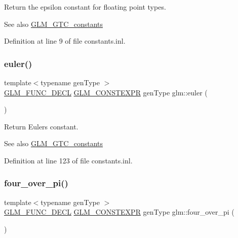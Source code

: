 Return the epsilon constant for floating point types. \begin{DoxySeeAlso}{See also}
\mbox{\hyperlink{group__gtc__constants}{G\+L\+M\+\_\+\+G\+T\+C\+\_\+constants}} 
\end{DoxySeeAlso}


Definition at line 9 of file constants.\+inl.

\mbox{\label{group__gtc__constants_gad8fe2e6f90bce9d829e9723b649fbd42}} 
\subsubsection{\texorpdfstring{euler()}{euler()}}
{\footnotesize\ttfamily template$<$typename gen\+Type $>$ \\
\mbox{\hyperlink{setup_8hpp_ab2d052de21a70539923e9bcbf6e83a51}{G\+L\+M\+\_\+\+F\+U\+N\+C\+\_\+\+D\+E\+CL}} \mbox{\hyperlink{setup_8hpp_a08b807947b47031d3a511f03f89645ad}{G\+L\+M\+\_\+\+C\+O\+N\+S\+T\+E\+X\+PR}} gen\+Type glm\+::euler (\begin{DoxyParamCaption}{ }\end{DoxyParamCaption})}

Return Euler\textquotesingle{}s constant. \begin{DoxySeeAlso}{See also}
\mbox{\hyperlink{group__gtc__constants}{G\+L\+M\+\_\+\+G\+T\+C\+\_\+constants}} 
\end{DoxySeeAlso}


Definition at line 123 of file constants.\+inl.

\mbox{\label{group__gtc__constants_ga753950e5140e4ea6a88e4a18ba61dc09}} 
\subsubsection{\texorpdfstring{four\_over\_pi()}{four\_over\_pi()}}
{\footnotesize\ttfamily template$<$typename gen\+Type $>$ \\
\mbox{\hyperlink{setup_8hpp_ab2d052de21a70539923e9bcbf6e83a51}{G\+L\+M\+\_\+\+F\+U\+N\+C\+\_\+\+D\+E\+CL}} \mbox{\hyperlink{setup_8hpp_a08b807947b47031d3a511f03f89645ad}{G\+L\+M\+\_\+\+C\+O\+N\+S\+T\+E\+X\+PR}} gen\+Type glm\+::four\+\_\+over\+\_\+pi (\begin{DoxyParamCaption}{ }\end{DoxyParamCaption})}

